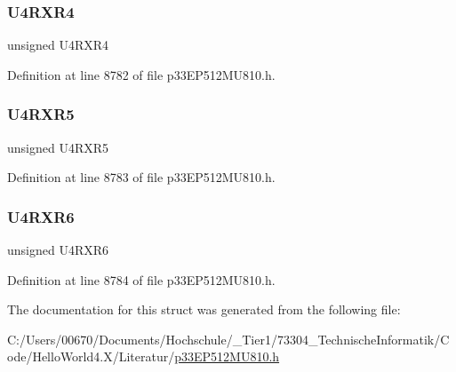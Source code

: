 \subsubsection{\texorpdfstring{U4\+R\+X\+R4}{U4RXR4}}
{\footnotesize\ttfamily unsigned U4\+R\+X\+R4}



Definition at line 8782 of file p33\+E\+P512\+M\+U810.\+h.

\mbox{\label{structtag_r_p_i_n_r28_b_i_t_s_a7c59af666f690f986ad5bbf29cca3dfa}} 
\subsubsection{\texorpdfstring{U4\+R\+X\+R5}{U4RXR5}}
{\footnotesize\ttfamily unsigned U4\+R\+X\+R5}



Definition at line 8783 of file p33\+E\+P512\+M\+U810.\+h.

\mbox{\label{structtag_r_p_i_n_r28_b_i_t_s_a950f9ebc01abf2b51c0da8efc6d4e8fa}} 
\subsubsection{\texorpdfstring{U4\+R\+X\+R6}{U4RXR6}}
{\footnotesize\ttfamily unsigned U4\+R\+X\+R6}



Definition at line 8784 of file p33\+E\+P512\+M\+U810.\+h.



The documentation for this struct was generated from the following file\+:\begin{DoxyCompactItemize}
\item 
C\+:/\+Users/00670/\+Documents/\+Hochschule/\+\_\+\+Tier1/73304\+\_\+\+Technische\+Informatik/\+Code/\+Hello\+World4.\+X/\+Literatur/\hyperlink{p33_e_p512_m_u810_8h}{p33\+E\+P512\+M\+U810.\+h}\end{DoxyCompactItemize}
